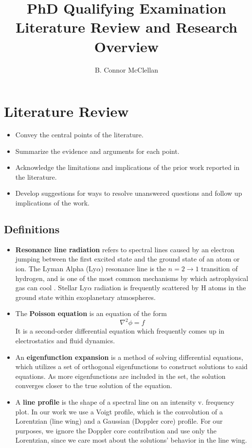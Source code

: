 \documentclass[onecolumn]{aastex63}
\begin{document}
\title{PhD Qualifying Examination \\ \small{\normalfont Literature Review and Research Overview}}
\author{B. Connor McClellan}
\keywords{}

\tableofcontents

\section{Literature Review}

\begin{itemize}
    \item Convey the central points of the literature.
    \item Summarize the evidence and arguments for each point.
    \item Acknowledge the limitations and implications of the prior work reported in the literature.
    \item Develop suggestions for ways to resolve unanswered questions and follow up implications of the work.
\end{itemize}

\subsection{Definitions}
\begin{itemize}
    \item \textbf{Resonance line radiation} refers to spectral lines caused by an electron jumping between the first excited state and the ground state of an atom or ion. The Lyman Alpha (Ly$\alpha$) resonance line is the $n=2\rightarrow1$ transition of hydrogen, and is one of the most common mechanisms by which astrophysical gas can cool \citep{neufeld1990}. Stellar Ly$\alpha$ radiation is frequently scattered by H atoms in the ground state within exoplanetary atmospheres.
    \item The \textbf{Poisson equation} is an equation of the form
    \begin{equation}
        \nabla^2 \phi = f
    \end{equation}
    It is a second-order differential equation which frequently comes up in electrostatics and fluid dynamics.
    \item An \textbf{eigenfunction expansion} is a method of solving differential equations, which utilizes a set of orthogonal eigenfunctions to construct solutions to said equations. As more eigenfunctions are included in the set, the solution converges closer to the true solution of the equation.
    \item A \textbf{line profile} is the shape of a spectral line on an intensity v. frequency plot. In our work we use a Voigt profile, which is the convolution of a Lorentzian (line wing) and a Gaussian (Doppler core) profile. For our purposes, we ignore the Doppler core contribution and use only the Lorentzian, since we care most about the solutions' behavior in the line wing.
\end{itemize}
\end{document}
